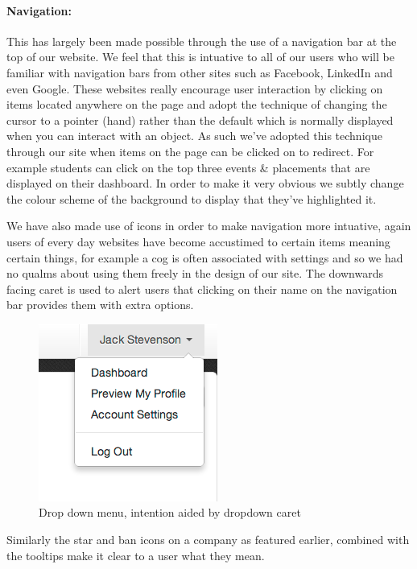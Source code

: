     \paragraph{Navigation:} This has largely been made possible through the use of a navigation bar at the top of our website. We feel that this is intuative to all of our users who will be familiar with navigation bars from other sites such as Facebook\cite{facebook}, LinkedIn\cite{linkedin} and even Google\cite{google}. These websites really encourage user interaction by clicking on items located anywhere on the page and adopt the technique of changing the cursor to a pointer (hand) rather than the default which is normally displayed when you can interact with an object. As such we've adopted this technique through our site when items on the page can be clicked on to redirect. For example students can click on the top three events \& placements that are displayed on their dashboard. In order to make it very obvious we subtly change the colour scheme of the background to display that they've highlighted it.

    We have also made use of icons in order to make navigation more intuative, again users of every day websites have become accustimed to certain items meaning certain things, for example a cog is often associated with settings and so we had no qualms about using them freely in the design of our site.
    The downwards facing caret is used to alert users that clicking on their name on the navigation bar provides them with extra options.
    
    \begin{figure}[H]\centering
    \includegraphics[scale=0.5]{images/design/navigation_caret}
    \caption{Drop down menu, intention aided by dropdown caret}
    \end{figure}

    Similarly the star and ban icons on a company as featured earlier, combined with the tooltips make it clear to a user what they mean.